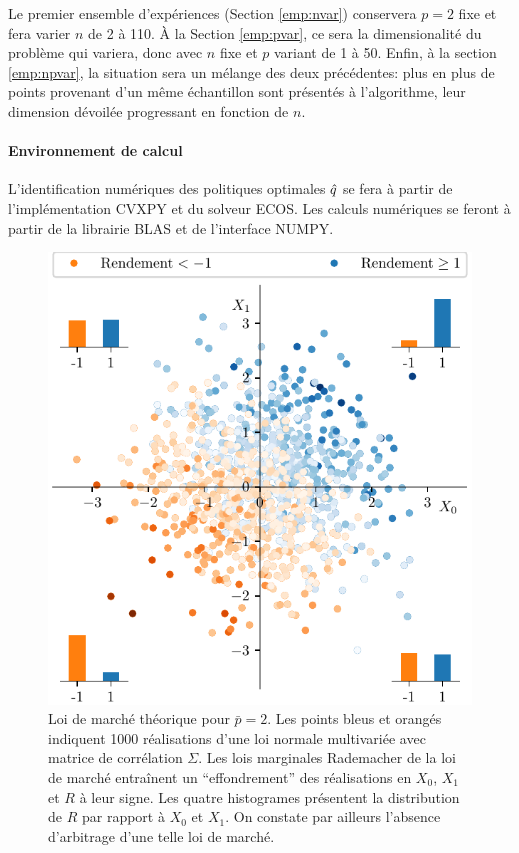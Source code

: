 Le premier ensemble d'expériences (Section \ref{emp:nvar}) conservera $p=2$ fixe et fera
varier $n$ de 2 à 110. À la Section \ref{emp:pvar}, ce sera la dimensionalité du problème
qui variera, donc avec $n$ fixe et $p$ variant de 1 à 50. Enfin, à la section
\ref{emp:npvar}, la situation sera un mélange des deux précédentes: plus en plus de points
provenant d'un même échantillon sont présentés à l'algorithme, leur dimension dévoilée
progressant en fonction de $n$.



\paragraph{Environnement de calcul}

L'identification numériques des politiques optimales $\hat q$ se fera à partir de
l'implémentation CVXPY\cite{cvxpy} et du solveur ECOS\cite{ecos}. Les calculs numériques
se feront à partir de la librairie BLAS et de l'interface NUMPY.

\newpage



\begin{figure}[ht]
  \centering
  \includegraphics[width=\textwidth]{../experiments/fig/copula.pdf}
  \caption[Loi de marché]{Loi de marché théorique pour $\bar p = 2$. Les points bleus et
    orangés indiquent \num{1000} réalisations d'une loi normale multivariée avec matrice
    de corrélation $\Sigma$. Les lois marginales Rademacher de la loi de marché entraînent un
    ``effondrement'' des réalisations en $X_0$, $X_1$ et $R$ à leur signe. Les quatre
    histogrames présentent la distribution de $R$ par rapport à $X_0$ et $X_1$. On
    constate par ailleurs l'absence d'arbitrage d'une telle loi de marché.}
  \label{fig_copula}
\end{figure}


